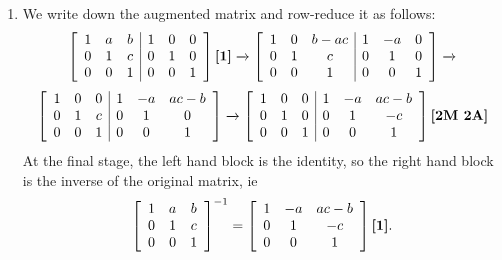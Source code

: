 \documentclass{amsart}
\newcommand{\xra}{\xrightarrow}
\renewcommand{\:}       {\colon}
\newcommand{\mks}[1]    {\mbox{\bf [#1]}}
\newcommand{\mk}        {\mbox{\bf [1]}}
\begin{document}
\begin{enumerate}
 \item %
  We write down the augmented matrix and row-reduce it as follows:
  \[ \left[\begin{array}{ccc|ccc}
      1 & a & b & 1 & 0 & 0 \\ 
      0 & 1 & c & 0 & 1 & 0 \\ 
      0 & 0 & 1 & 0 & 0 & 1 
     \end{array}\right] \mk \xra{}
     \left[\begin{array}{ccc|ccc}
      1 & 0 & b-ac & 1 & -a & 0 \\ 
      0 & 1 & c & 0 & 1 & 0 \\ 
      0 & 0 & 1 & 0 & 0 & 1 
     \end{array}\right] \xra{}
  \] \[
     \left[\begin{array}{ccc|ccc}
      1 & 0 & 0 & 1 & -a & ac-b \\ 
      0 & 1 & c & 0 & 1 & 0 \\ 
      0 & 0 & 1 & 0 & 0 & 1 
     \end{array}\right] \xra{}
     \left[\begin{array}{ccc|ccc}
      1 & 0 & 0 & 1 & -a & ac-b \\ 
      0 & 1 & 0 & 0 & 1 & -c \\ 
      0 & 0 & 1 & 0 & 0 & 1 
     \end{array}\right] \mks{2M 2A}
  \]
  At the final stage, the left hand block is the identity, so
  the right hand block is the inverse of the original matrix, ie
  \[ \left[\begin{array}{ccc}
      1 & a & b \\ 0 & 1 & c \\ 0 & 0 & 1 
     \end{array}\right]^{-1} = 
     \left[\begin{array}{ccc}
      1 & -a & ac-b \\ 0 & 1 & -c \\ 0 & 0 & 1 
     \end{array}\right] \mk.
  \]

\end{enumerate}

\renewcommand{\theenumi}{B\arabic{enumi}}
\end{document}
